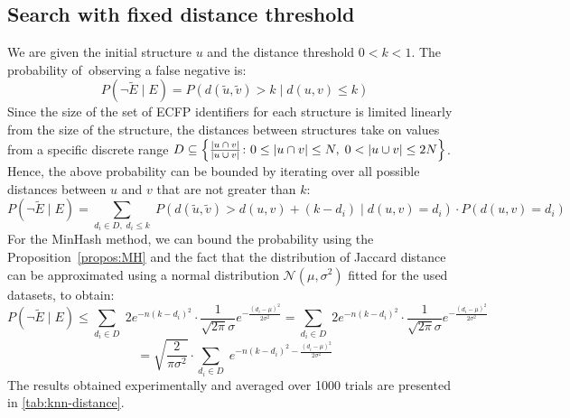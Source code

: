 \subsection{Search with fixed distance threshold}
We are given the initial structure \( u \) and the distance threshold \( 0 < k < 1 \). The probability of~observing a false negative is:
\[
    P(\neg \tilde{E} \mid E) = P(d(\tilde{u}, \tilde{v}) > k \mid d(u, v) \leq k)
\]
Since the size of the set of ECFP identifiers for each structure is limited linearly from the size of the structure, the distances between structures take on values from a specific discrete range \linebreak \( D \subseteq \left\{ \frac{\left| u \:\cap\: v \right|}{\left| u \:\cup\: v \right|} \colon 0 \leq \left| u \cap v \right| \leq N,\; 0 < \left| u \cup v \right| \leq 2N \right\} \). Hence, the above probability can be bounded by iterating over all possible distances between \( u \) and \( v \) that are not greater than \( k \):
\[
    P(\neg \tilde{E} \mid E) = \sum_{d_i \in D,\; d_i \leq k}\; P(d(\tilde{u}, \tilde{v}) > d(u, v) + (k - d_i) \mid d(u, v) = d_i) \cdot P(d(u, v) = d_i)
\]
For the MinHash method, we can bound the probability using the Proposition~\ref{propos:MH} and the fact that the distribution of Jaccard distance can be approximated using a normal distribution \( \mathcal{N}(\mu, \sigma^2) \) fitted for the used datasets, to obtain:
\[
    P(\neg \tilde{E} \mid E) \leq \sum_{d_i \in D}\; 2e^{-n(k-d_i)^2} \cdot \frac{1}{\sqrt{2 \pi} \sigma} e^{-\frac{(d_i - \mu)^2}{2\sigma^2}} = \sum_{d_i \in D}\; 2e^{-n(k-d_i)^2} \cdot \frac{1}{\sqrt{2 \pi} \sigma} e^{-\frac{(d_i - \mu)^2}{2\sigma^2}} 
\]
\[
    = \sqrt{\frac{2}{\pi\sigma^2}} \cdot \sum_{d_i \in D}\; e^{-n(k-d_i)^2-\frac{(d_i - \mu)^2}{2\sigma^2}}
\]
The results obtained experimentally and averaged over 1000 trials are presented in \autoref{tab:knn-distance}.
